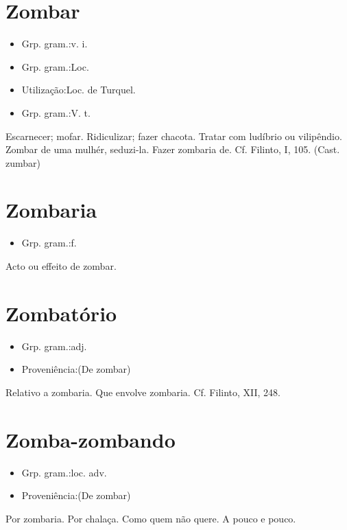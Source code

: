 \section{Zombar}
\begin{itemize}
\item {Grp. gram.:v. i.}
\end{itemize}
\begin{itemize}
\item {Grp. gram.:Loc.}
\end{itemize}
\begin{itemize}
\item {Utilização:Loc. de Turquel.}
\end{itemize}
\begin{itemize}
\item {Grp. gram.:V. t.}
\end{itemize}
Escarnecer; mofar.
Ridiculizar; fazer chacota.
Tratar com ludíbrio ou vilipêndio.
\textunderscore Zombar de uma mulhér\textunderscore , seduzi-la.
Fazer zombaria de. Cf. Filinto, I, 105.
(Cast. \textunderscore zumbar\textunderscore )
\section{Zombaria}
\begin{itemize}
\item {Grp. gram.:f.}
\end{itemize}
Acto ou effeito de zombar.
\section{Zombatório}
\begin{itemize}
\item {Grp. gram.:adj.}
\end{itemize}
\begin{itemize}
\item {Proveniência:(De \textunderscore zombar\textunderscore )}
\end{itemize}
Relativo a zombaria.
Que envolve zombaria. Cf. Filinto, XII, 248.
\section{Zomba-zombando}
\begin{itemize}
\item {Grp. gram.:loc. adv.}
\end{itemize}
\begin{itemize}
\item {Proveniência:(De \textunderscore zombar\textunderscore )}
\end{itemize}
Por zombaria.
Por chalaça.
Como quem não quere.
A pouco e pouco.
